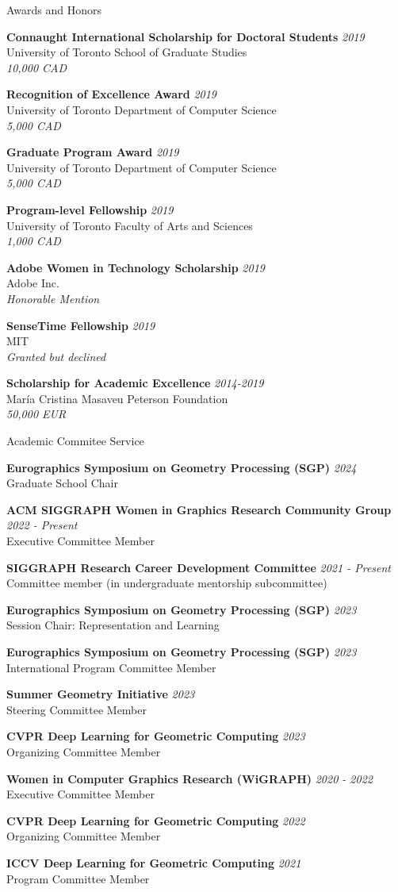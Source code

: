\documentclass{resume}
\newcommand{\cvitembig}[4]{
    {\bf #1} \hfill {\em \small #2} \\ 
    {\small#3 }\\
    {\it \small #4}
}
\newcommand{\cvitem}[3]{
    {\bf #1} \hfill {\em \small #2} \\ 
    {\small#3 }
}
\begin{document}
\begin{rSection}{Awards and Honors}
\cvitembig{Connaught International Scholarship for Doctoral Students}{2019}{University of Toronto School of Graduate Studies}{10,000 CAD}

\cvitembig{Recognition of Excellence Award}{2019}{University of Toronto Department of Computer Science}{5,000 CAD}

\cvitembig{Graduate Program Award}{2019}{University of Toronto Department of Computer Science}{5,000 CAD}

\cvitembig{Program-level Fellowship}{2019}{University of Toronto Faculty of Arts and Sciences}{1,000 CAD}

\cvitembig{Adobe Women in Technology Scholarship}{2019}{Adobe Inc.}{Honorable Mention}

\cvitembig{SenseTime Fellowship}{2019}{MIT}{Granted but declined}


\cvitembig{ Scholarship for Academic Excellence}{2014-2019}{Mar\'{i}a Cristina Masaveu Peterson Foundation}{50,000 EUR}

\end{rSection}

\begin{rSection}{Academic Commitee Service}

\cvitem{Eurographics Symposium on Geometry Processing (SGP)}{2024}{Graduate School Chair}

\cvitem{ACM SIGGRAPH Women in Graphics Research Community Group}{2022 - Present}{Executive Committee Member}

\cvitem{SIGGRAPH Research Career Development Committee}{2021 - Present}{Committee member (in undergraduate mentorship subcommittee)}

\cvitem{Eurographics Symposium on Geometry Processing (SGP)}{2023}{Session Chair: Representation and Learning}

\cvitem{Eurographics Symposium on Geometry Processing (SGP)}{2023}{International Program Committee Member}

\cvitem{Summer Geometry Initiative}{2023}{Steering Committee Member}

\cvitem{CVPR Deep Learning for Geometric Computing}{2023}{Organizing Committee Member}

\cvitem{Women in Computer Graphics Research (WiGRAPH)}{2020 - 2022}{Executive Committee Member}

\cvitem{CVPR Deep Learning for Geometric Computing}{2022}{Organizing Committee Member}

\cvitem{ICCV Deep Learning for Geometric Computing}{2021}{Program Committee Member}

\end{rSection}
\end{document}
